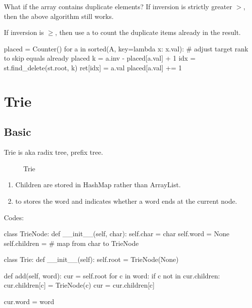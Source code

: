  What if the array contains duplicate elements? 
If inversion is strictly greater $>$, then the above algorithm still works. 

If inversion is $\ge$, then use a  to count the duplicate items already in the result. 
\begin{python}
placed = Counter()
for a in sorted(A, key=lambda x: x.val):
    # adjust target rank to skip equals already placed
    k = a.inv - placed[a.val] + 1
    idx = st.find_delete(st.root, k)
    ret[idx] = a.val
    placed[a.val] += 1
\end{python}

\section{Trie}
\subsection{Basic}
Trie is aka radix tree, prefix tree. 
\begin{figure}[hbtp]
\centering
{}
\caption{Trie}
\label{fig:trie} 
\end{figure}
\begin{enumerate}
\item Children are stored in HashMap rather than ArrayList. 
\item {} to stores the word and indicates whether a word ends at the current
node. 
\end{enumerate}
Codes:
\begin{python}
class TrieNode:
    def __init__(self, char):
        self.char = char
        self.word = None
        self.children = {}  # map from char to TrieNode


class Trie:
    def __init__(self):
        self.root = TrieNode(None)

    def add(self, word):
        cur = self.root
        for c in word:
            if c not in cur.children:
                cur.children[c] = TrieNode(c)
            cur = cur.children[c]
            
        cur.word = word
\end{python}

